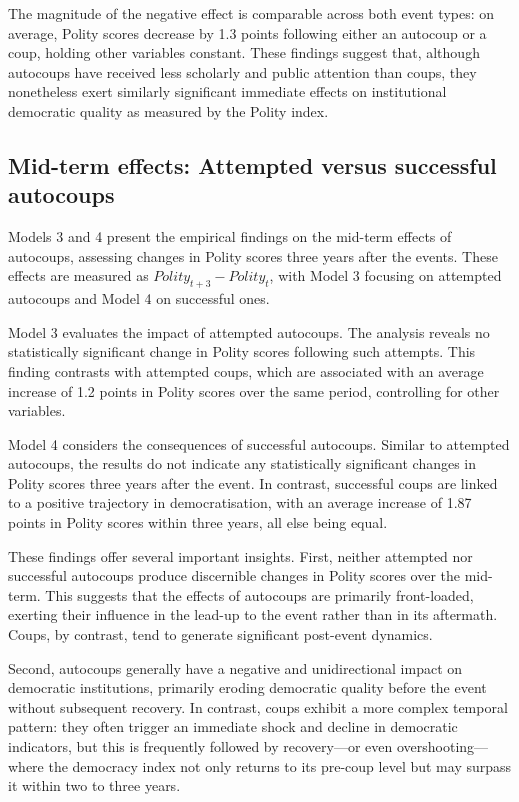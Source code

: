 \documentclass[
  12pt,
]{report}
\begin{document}
The magnitude of the negative effect is comparable across both event
types: on average, Polity scores decrease by 1.3 points following either
an autocoup or a coup, holding other variables constant. These findings
suggest that, although autocoups have received less scholarly and public
attention than coups, they nonetheless exert similarly significant
immediate effects on institutional democratic quality as measured by the
Polity index.

\subsection*{Mid-term effects: Attempted versus successful
autocoups}\label{mid-term-effects-attempted-versus-successful-autocoups}

Models 3 and 4 present the empirical findings on the mid-term effects of
autocoups, assessing changes in Polity scores three years after the
events. These effects are measured as
\(Polity_{t+3} - Polity_{t}\)\hspace{0pt}, with Model 3 focusing on
attempted autocoups and Model 4 on successful ones.

Model 3 evaluates the impact of attempted autocoups. The analysis
reveals no statistically significant change in Polity scores following
such attempts. This finding contrasts with attempted coups, which are
associated with an average increase of 1.2 points in Polity scores over
the same period, controlling for other variables.

Model 4 considers the consequences of successful autocoups. Similar to
attempted autocoups, the results do not indicate any statistically
significant changes in Polity scores three years after the event. In
contrast, successful coups are linked to a positive trajectory in
democratisation, with an average increase of 1.87 points in Polity
scores within three years, all else being equal.

These findings offer several important insights. First, neither
attempted nor successful autocoups produce discernible changes in Polity
scores over the mid-term. This suggests that the effects of autocoups
are primarily front-loaded, exerting their influence in the lead-up to
the event rather than in its aftermath. Coups, by contrast, tend to
generate significant post-event dynamics.

Second, autocoups generally have a negative and unidirectional impact on
democratic institutions, primarily eroding democratic quality before the
event without subsequent recovery. In contrast, coups exhibit a more
complex temporal pattern: they often trigger an immediate shock and
decline in democratic indicators, but this is frequently followed by
recovery---or even overshooting---where the democracy index not only
returns to its pre-coup level but may surpass it within two to three
years.
\end{document}
